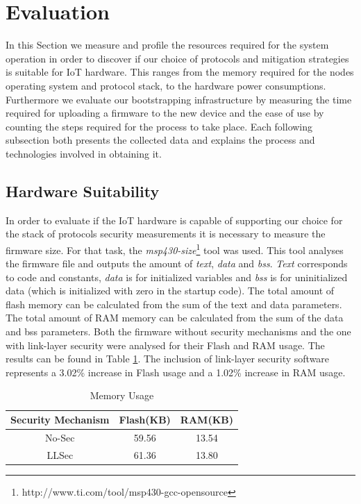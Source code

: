 \documentclass{sig-alternate-05-2015}
\begin{document}
\section{Evaluation}
\label{sec:evaluation}
In this Section we measure and profile the resources required for the system operation in order to discover if our choice of protocols and mitigation strategies is suitable for \gls{IoT} hardware. 
This ranges from the memory required for the nodes operating system and protocol stack, to the hardware power consumptions. 
Furthermore we evaluate our bootstrapping infrastructure by measuring the time required for uploading a firmware to the new device and the ease of use by counting the steps required for the process to take place. 
Each following subsection both presents the collected data and explains the process and technologies involved in obtaining it.

\subsection{Hardware Suitability}
In order to evaluate if the \gls{IoT} hardware is capable of supporting our choice for the stack of protocols security measurements it is necessary to measure the firmware size. 
For that task, the \textit{msp430-size}\footnote{http://www.ti.com/tool/msp430-gcc-opensource} tool was used. 
This tool analyses the firmware file and outputs the amount of \textit{text}, \textit{data} and \textit{bss}.
\textit{Text} corresponds to code and constants, \textit{data} is for initialized variables and \textit{bss} is for uninitialized data (which is initialized with zero in the startup code).
The total amount of flash memory can be calculated from the sum of the text and data parameters.
The total amount of \gls{RAM} memory can be calculated from the sum of the data and bss parameters.
Both the firmware without security mechanisms and the one with link-layer security were analysed for their Flash and RAM usage. 
The results can be found in Table \ref{tab:space_req}. The inclusion of link-layer security software represents a 3.02\% increase in Flash usage and a 1.02\% increase in RAM usage.

\begin{table}
\centering
\caption{Memory Usage}
\label{tab:space_req}
\begin{tabular}{|c|c|c|} \hline
Security Mechanism&Flash(KB)&RAM(KB)\\ \hline
No-Sec& 59.56& 13.54\\ \hline
LLSec& 61.36& 13.80\\ %
\hline\end{tabular}
\end{table}
\end{document}
